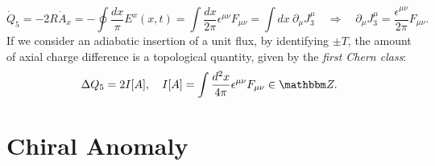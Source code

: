 \documentclass[aps,prb,superscriptaddress,nofootinbib]{revtex4}
\begin{document}
\begin{equation}
	\dot Q_5 = -2R \dot A_x = -\oint \frac{dx}{\pi} E^x(x,t) = \int \frac{dx}{2\pi}\epsilon^{\mu\nu}F_{\mu\nu} = \int dx\ \partial_\mu J_3^\mu \quad \Longrightarrow \quad
	\partial_\mu J_3^\mu = \frac{\epsilon^{\mu\nu}}{2\pi} F_{\mu\nu}.
\end{equation}
If we consider an adiabatic insertion of a unit flux, by identifying $\pm T$, the amount of axial charge difference is a topological quantity, given by the \textit{first Chern class}:
\begin{equation}
	\Delta Q_5 = 2I[A], \quad
	I[A] = \int \frac{d^2 x}{4\pi} \epsilon^{\mu\nu}F_{\mu\nu} \in \mathbbm Z.
\end{equation}






\section{Chiral Anomaly}
\end{document}
